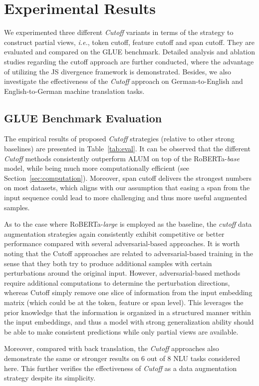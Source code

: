\documentclass[11pt,a4paper]{article}
\begin{document}
\section{Experimental Results}
We experimented three different \emph{Cutoff} variants in terms of the strategy to construct partial views, \emph{i.e.}, token cutoff, feature cutoff and span cutoff. They are evaluated and compared on the GLUE benchmark. Detailed analysis and ablation studies regarding the cutoff approach are further conducted, where the advantage of utilizing the JS divergence framework is demonstrated. Besides, we also investigate the effectiveness of the \emph{Cutoff} approach on German-to-English and English-to-German machine translation tasks. 

\subsection{GLUE Benchmark Evaluation}
The empirical results of proposed \emph{Cutoff} strategies (relative to other strong baselines) are presented in Table~\ref{tab:eval}. It can be observed that the different \emph{Cutoff} methods consistently outperform ALUM on top of the RoBERTa-\emph{base} model, while being much more computationally efficient (see Section~\ref{sec:computation}). Moreover, span cutoff delivers the strongest numbers on most datasets, which aligns with our assumption that easing a span from the input sequence could lead to more challenging and thus more useful augmented samples. 

As to the case where RoBERTa-\emph{large} is employed as the baseline, the \emph{cutoff} data augmentation strategies again consistently exhibit competitive or better performance compared with several adversarial-based approaches. 
It is worth noting that the Cutoff approaches are related to adversarial-based training in the sense that they both try to produce additional samples with certain perturbations around the original input. However, adversarial-based methods require additional computations to determine the perturbation directions, whereas Cutoff simply remove one slice of information from  the input embedding matrix (which could be at the token, feature or span level). This leverages the prior knowledge that the information is organized in a structured manner within the input embeddings, and thus a model with strong generalization ability should be able to make consistent predictions while only partial views are available.

Moreover, compared with back translation, the \emph{Cutoff} approaches also demonstrate the same or stronger results on $6$ out of $8$ NLU tasks considered here. This further verifies the effectiveness of \emph{Cutoff} as a data augmentation strategy despite its simplicity.  
\end{document}
